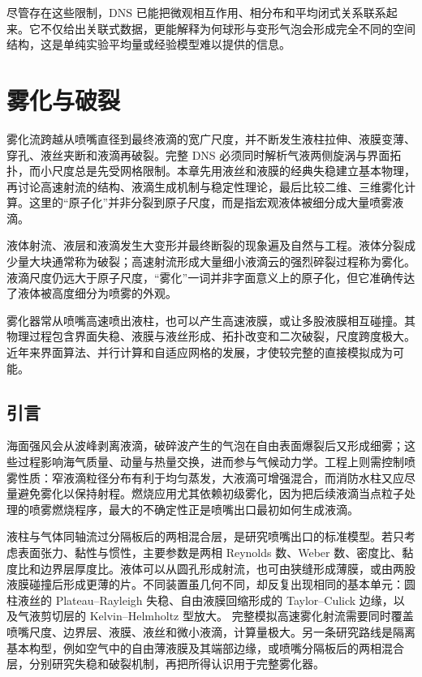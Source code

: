 \documentclass[11pt,a4paper,openany,fontset=none]{ctexbook}
\begin{document}
尽管存在这些限制，DNS 已能把微观相互作用、相分布和平均闭式关系联系起来。它不仅给出关联式数据，更能解释为何球形与变形气泡会形成完全不同的空间结构，这是单纯实验平均量或经验模型难以提供的信息。

\chapter{雾化与破裂}

雾化流跨越从喷嘴直径到最终液滴的宽广尺度，并不断发生液柱拉伸、液膜变薄、穿孔、液丝夹断和液滴再破裂。完整 DNS 必须同时解析气液两侧旋涡与界面拓扑，而小尺度总是先受网格限制。本章先用液丝和液膜的经典失稳建立基本物理，再讨论高速射流的结构、液滴生成机制与稳定性理论，最后比较二维、三维雾化计算。这里的“原子化”并非分裂到原子尺度，而是指宏观液体被细分成大量喷雾液滴。

液体射流、液层和液滴发生大变形并最终断裂的现象遍及自然与工程。液体分裂成少量大块通常称为破裂；高速射流形成大量细小液滴云的强烈碎裂过程称为雾化。液滴尺度仍远大于原子尺度，“雾化”一词并非字面意义上的原子化，但它准确传达了液体被高度细分为喷雾的外观。

雾化器常从喷嘴高速喷出液柱，也可以产生高速液膜，或让多股液膜相互碰撞。其物理过程包含界面失稳、液膜与液丝形成、拓扑改变和二次破裂，尺度跨度极大。近年来界面算法、并行计算和自适应网格的发展，才使较完整的直接模拟成为可能。

\section{引言}

海面强风会从波峰剥离液滴，破碎波产生的气泡在自由表面爆裂后又形成细雾；这些过程影响海气质量、动量与热量交换，进而参与气候动力学。工程上则需控制喷雾性质：窄液滴粒径分布有利于均匀蒸发，大液滴可增强混合，而消防水柱又应尽量避免雾化以保持射程。燃烧应用尤其依赖初级雾化，因为把后续液滴当点粒子处理的喷雾燃烧程序，最大的不确定性正是喷嘴出口最初如何生成液滴。

液柱与气体同轴流过分隔板后的两相混合层，是研究喷嘴出口的标准模型。若只考虑表面张力、黏性与惯性，主要参数是两相 Reynolds 数、Weber 数、密度比、黏度比和边界层厚度比。液体可以从圆孔形成射流，也可由狭缝形成薄膜，或由两股液膜碰撞后形成更薄的片。不同装置虽几何不同，却反复出现相同的基本单元：圆柱液丝的 Plateau--Rayleigh 失稳、自由液膜回缩形成的 Taylor--Culick 边缘，以及气液剪切层的 Kelvin--Helmholtz 型放大。
完整模拟高速雾化射流需要同时覆盖喷嘴尺度、边界层、液膜、液丝和微小液滴，计算量极大。另一条研究路线是隔离基本构型，例如空气中的自由薄液膜及其端部边缘，或喷嘴分隔板后的两相混合层，分别研究失稳和破裂机制，再把所得认识用于完整雾化器。
\end{document}
